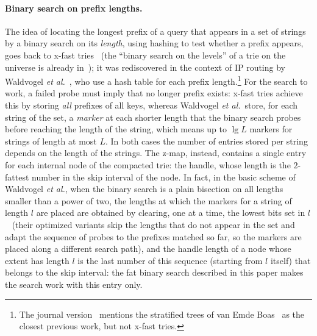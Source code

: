 \documentclass[a4paper]{article}
\newcommand{\?}{\mskip1.5mu}
\begin{document}
\paragraph{Binary search on prefix lengths.} The idea of locating the longest prefix of a query that appears in a set of strings by a binary search on its \emph{length}, 
using hashing to test whether a prefix appears, goes back to x-fast tries~\cite{WilLLWRQ} (the ``binary search on the levels'' of a trie on the universe is already in~\cite{vanEmdeBoas1975Preserving}); it was rediscovered in the context 
of IP routing by Waldvogel \textit{et al.}~\cite{Waldvogel1997Scalable}, who use a hash table for each prefix 
length.\footnote{The journal version~\cite{Waldvogel2001Scalable} mentions the stratified trees of van Emde Boas~\cite{EKZDIEPQ} as the closest 
previous work, but not x-fast tries.} 
For the search to work, a failed probe must imply that no longer prefix exists: x-fast tries achieve this by storing 
\emph{all} prefixes of all keys, whereas Waldvogel \textit{et al.}~store, for each string of the set, a \emph{marker} at each shorter length that the binary search 
probes before reaching the length of the string, which means up to $\lg L$ markers for strings of length at most $L$. 
In both cases the number of entries stored per string depends on the length of the strings. 
The z-map, instead, contains a single entry for each internal node of the compacted trie: the handle, whose length 
is the $2$-fattest number in the skip interval of the node. In fact, in the basic scheme of Waldvogel \textit{et al.}, when the binary search 
is a plain bisection on all lengths smaller than a power of two, the lengths at which the markers for a string of length $l$ are placed 
are obtained by clearing, one at a time, the lowest bits set in $l$~\cite{Waldvogel2001Scalable} (their optimized variants skip the lengths 
that do not appear in the set and adapt the sequence of probes to the prefixes matched so far, so the markers are placed along a different search path), 
and the handle length of a node whose extent has length $l$ is the last number of this sequence (starting from $l$ itself) that
belongs to the skip interval: the fat binary search described in this paper makes the search work with this entry only.
\end{document}
